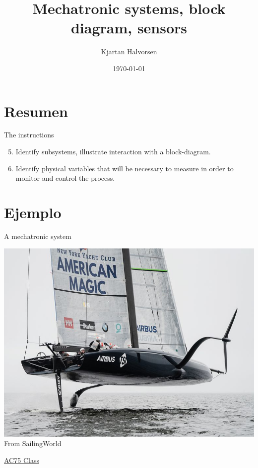 \documentclass[presentation,aspectratio=169]{beamer}
\author{Kjartan Halvorsen}
\date{\today}
\title{Mechatronic systems, block diagram, sensors}
\begin{document}
\maketitle

\section{Resumen}
\label{sec:orgc564195}

\begin{frame}[label={sec:org104e466}]{The instructions}
\begin{enumerate}
\setcounter{enumi}{4}
\item Identify \alert{subsystems}, illustrate interaction with a \alert{block-diagram}.
\item Identify \alert{physical variables} that will be necessary to measure in order to monitor and control the process.
\end{enumerate}
\end{frame}



\section{Ejemplo}
\label{sec:orgf2aba7a}
\begin{frame}[label={sec:org373e9f2}]{A mechatronic system}
\begin{center}
\includegraphics[height=0.7\textheight]{../../figures/ac75.jpeg}\\
{\footnotesize  From SailingWorld}
\end{center}

\href{https://www.sailingscuttlebutt.com/wp-content/uploads/2018/03/AC75\_Class\_Rule.pdf}{AC75 Class}
\end{frame}
\end{document}
